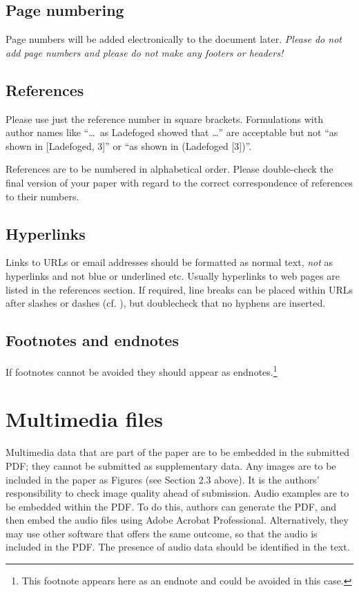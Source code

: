 \documentclass[a4paper,11pt,twocolumn]{article}
\let\rmarkdownfootnote\footnote%
\def\footnote{\protect\rmarkdownfootnote}
\begin{document}
\subsection{Page numbering}

Page numbers will be added electronically to the document later.
\textit{Please do not add page numbers and please do not make any footers or 
headers!}

\subsection{References}

Please use just the reference number in square brackets. Formulations
with author names like ``\ldots~as Ladefoged \cite{Ladefoged:2003}
showed that \ldots'' are acceptable but not ``as shown in {[}Ladefoged,
3{]}'' or ``as shown in (Ladefoged {[}3{]})''.

References are to be numbered in alphabetical order. Please double-check
the final version of your paper with regard to the correct
correspondence of references to their numbers.

\subsection{Hyperlinks}

Links to URLs or email addresses should be formatted as normal text,
\textit{not} as hyperlinks and not blue or underlined etc. Usually
hyperlinks to web pages are listed in the references section. If
required, line breaks can be placed within URLs after slashes or dashes
(cf. \cite{IPA-SIL, IPA-KEYBOARD}), but doublecheck that no hyphens are
inserted.

\subsection{Footnotes and endnotes}

If footnotes cannot be avoided they should appear as
endnotes.\footnote{This 
footnote appears here as an endnote and could be avoided in this case.}

\section{Multimedia files}

Multimedia data that are part of the paper are to be embedded in the
submitted PDF; they cannot be submitted as supplementary data. Any
images are to be included in the paper as Figures (see Section 2.3
above). It is the authors' responsibility to check image quality ahead
of submission. Audio examples are to be embedded within the PDF. To do
this, authors can generate the PDF, and then embed the audio files using
Adobe Acrobat Professional. Alternatively, they may use other software
that offers the same outcome, so that the audio is included in the PDF.
The presence of audio data should be identified in the text.
\end{document}
